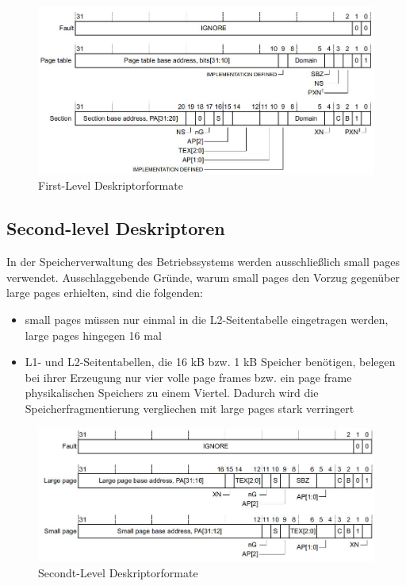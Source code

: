 \begin{figure}[H]
	\includegraphics[scale=0.7]{figures/firstLevelDescriptor}
	\caption{First-Level Deskriptorformate \cite[S. B3-1326]{ARM:ARM}}
	\label{fig:firstLevelDescriptor}
\end{figure}

\subsection*{Second-level Deskriptoren}

In der Speicherverwaltung des Betriebssystems werden ausschließlich small pages verwendet. Ausschlaggebende Gründe, warum small pages den Vorzug gegenüber large pages erhielten, sind die folgenden:

\begin{itemize}
	\item small pages müssen nur einmal in die L2-Seitentabelle eingetragen werden, large pages hingegen 16 mal
	\item L1- und L2-Seitentabellen, die 16 kB bzw. 1 kB Speicher benötigen, belegen bei ihrer Erzeugung nur vier volle page frames bzw. ein page frame physikalischen Speichers zu einem Viertel. Dadurch wird die Speicherfragmentierung vergliechen mit large pages stark verringert
\end{itemize}

\begin{figure}[H]
	\includegraphics[scale=0.7]{figures/secondLevelDescriptor}
	\caption{Secondt-Level Deskriptorformate \cite[S. B3-1327]{ARM:ARM}}
	\label{fig:secondLevelDescriptor}
\end{figure}

